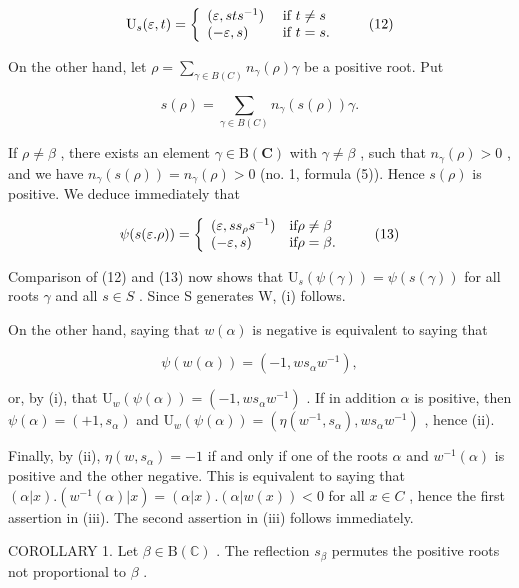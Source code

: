 \[
\mathrm{U} _ {s} (\varepsilon , t) = \left\{ \begin{array}{l l} (\varepsilon , s t s ^ {- 1}) & \text { if } t \neq s \\ (- \varepsilon , s) & \text { if } t = s. \end{array} \right.\tag{12}
\]

On the other hand, let \(\rho = \sum_{\gamma \in B(C)} n_{\gamma}(\rho) \gamma\) be a positive root. Put

\[
s (\rho) = \sum_ {\gamma \in B (C)} n _ {\gamma} (s (\rho)) \gamma .
\]

If \(\rho \neq \beta\) , there exists an element \(\gamma \in \mathrm{B}(\mathbf{C})\) with \(\gamma \neq \beta\) , such that \(n_{\gamma}(\rho) > 0\) , and we have \(n_{\gamma}(s(\rho)) = n_{\gamma}(\rho) > 0\) (no. 1, formula (5)). Hence \(s(\rho)\) is positive. We deduce immediately that

\[
\psi (s (\varepsilon . \rho)) = \left\{ \begin{array}{l l} (\varepsilon , s s _ {\rho} s ^ {- 1}) & \text {if} \rho \neq \beta \\ (- \varepsilon , s) & \text {if} \rho = \beta . \end{array} \right.\tag{13}
\]

Comparison of (12) and (13) now shows that \(\mathrm{U}_{s}(\psi(\gamma)) = \psi(s(\gamma))\) for all roots \(\gamma\) and all \(s \in S\) . Since S generates W, (i) follows.

On the other hand, saying that \(w(\alpha)\) is negative is equivalent to saying that

\[
\psi (w (\alpha)) = (- 1, w s _ {\alpha} w ^ {- 1}),
\]

or, by (i), that \(\mathrm{U}_w(\psi (\alpha)) = (-1, ws_{\alpha}w^{-1})\) . If in addition \(\alpha\) is positive, then \(\psi (\alpha) = (+1,s_{\alpha})\) and \(\mathrm{U}_w(\psi (\alpha)) = (\eta (w^{-1},s_{\alpha}),ws_{\alpha}w^{-1})\) , hence (ii).

Finally, by (ii), \(\eta(w,s_{\alpha})=-1\) if and only if one of the roots \(\alpha\) and \(w^{-1}(\alpha)\) is positive and the other negative. This is equivalent to saying that \((\alpha|x).(w^{-1}(\alpha)|x)=(\alpha|x).( \alpha|w(x))<0\) for all \(x\in C\) , hence the first assertion in (iii). The second assertion in (iii) follows immediately.

COROLLARY 1. Let \(\beta \in \mathrm{B}(\mathbb{C})\) . The reflection \(s_{\beta}\) permutes the positive roots not proportional to \(\beta\) .

